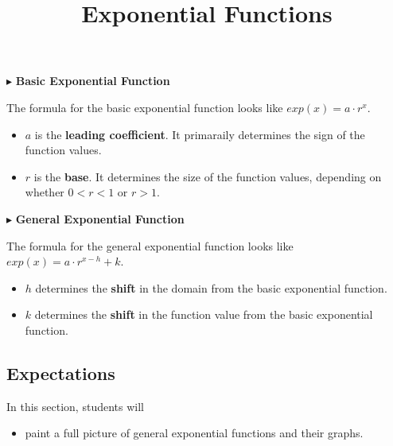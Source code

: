 \documentclass{ximera}
\title{Exponential Functions}
\begin{document}
\begin{abstract}
\end{abstract}
\maketitle



$\blacktriangleright$ \textbf{Basic Exponential Function}


The formula for the basic exponential function looks like $exp(x) = a \cdot r^x$. 

\begin{itemize}
\item $a$ is the \textbf{\textcolor{purple!85!blue}{leading coefficient}}.  It primaraily determines the sign of the function values.
\item $r$ is the \textbf{\textcolor{purple!85!blue}{base}}. It determines the size of the function values, depending on whether $0 < r < 1$ or $r > 1$.
\end{itemize}





$\blacktriangleright$ \textbf{General Exponential Function}

The formula for the general exponential function looks like $exp(x) = a \cdot r^{x - h} + k$. 

\begin{itemize}
\item $h$ determines the \textbf{\textcolor{purple!85!blue}{shift}} in the domain from the basic exponential function.  
\item $k$ determines the \textbf{\textcolor{purple!85!blue}{shift}} in the function value from the basic exponential function. 
\end{itemize}









\subsection{Expectations}


\begin{sectionOutcomes}
In this section, students will 

\begin{itemize}
\item paint a full picture of general exponential functions and their graphs.
\end{itemize}
\end{sectionOutcomes}
\end{document}
